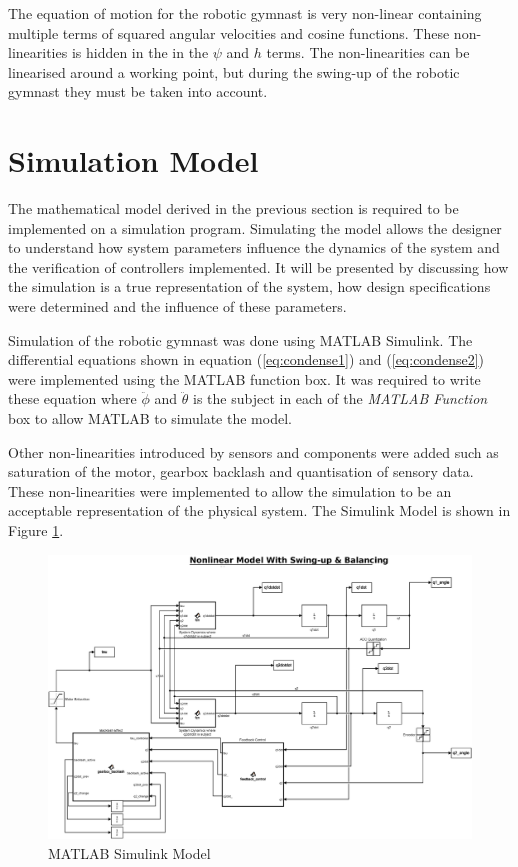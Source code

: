 The equation of motion for the robotic gymnast is very non-linear containing multiple terms of squared angular velocities and cosine functions. These non-linearities is hidden in the in the $\psi$ and $h$ terms. The non-linearities can be linearised around a working point, but during the swing-up of the robotic gymnast they must be taken into account.


\section{Simulation Model}
The mathematical model derived in the previous section is required to be implemented on a simulation program. Simulating the model allows the designer to understand how system parameters influence the dynamics of the system and the verification of controllers implemented. It will be presented by discussing how the simulation is a true representation of the system, how design specifications were determined and the influence of these parameters.

Simulation of the robotic gymnast was done using MATLAB Simulink. The differential equations shown in equation (\ref{eq:condense1}) and (\ref{eq:condense2}) were implemented using the MATLAB function box. It was required to write these equation where $\ddot{\phi}$ and $\ddot{\theta}$ is the subject in each of the \textit{MATLAB Function} box to allow MATLAB to simulate the model.

Other non-linearities introduced by sensors and components were added such as saturation of the motor, gearbox backlash and quantisation of sensory data. These non-linearities were implemented to allow the simulation to be an acceptable representation of the physical system. The Simulink Model is shown in Figure \ref{fig:sim_nonlinearfeedback}.

\begin{figure}[h]
	\centering
	\includegraphics[scale=0.3]{./figs/simulink/simulink_model.eps}
	\caption{MATLAB Simulink Model}
	\label{fig:sim_nonlinearfeedback}
\end{figure}

